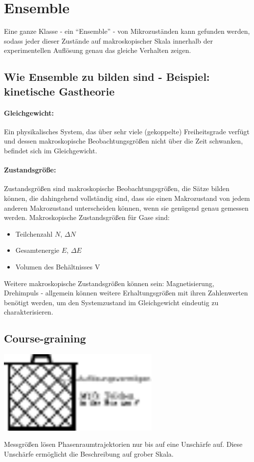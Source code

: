     \section{Ensemble}

Eine ganze Klasse - ein ``Ensemble'' - von Mikrozuständen
kann gefunden werden, sodass jeder dieser Zustände auf makroskopischer Skala
innerhalb der experimentellen Auflösung genau das gleiche Verhalten zeigen.

    \subsection{Wie Ensemble zu bilden sind - Beispiel: kinetische Gastheorie}

\paragraph{Gleichgewicht:} Ein physikalisches System, das über sehr viele
(gekoppelte) Freiheitsgrade verfügt und dessen makroskopische Beobachtungsgrößen
nicht über die Zeit schwanken, befindet sich im Gleichgewicht.

\paragraph{Zustandsgröße:} Zustandsgrößen sind makroskopische Beobachtungsgrößen, die
Sätze bilden können, die dahingehend vollständig sind, dass sie einen Makrozustand
von jedem anderen Makrozustand unterscheiden können, wenn sie genügend genau gemessen
werden. Makroskopische Zustandsgrößen für Gase sind:
\begin{itemize}
    \item Teilchenzahl $N$, $\Delta N$
    \item Gesamtenergie $E$, $\Delta E$
    \item Volumen des Behältnisses V
\end{itemize}
Weitere makroskopische Zustandsgrößen können sein: Magnetisierung, Drehimpuls -
allgemein können weitere Erhaltungsgrößen mit ihren Zahlenwerten benötigt werden, um
den Systemzustand im Gleichgewicht eindeutig zu charakterisieren.

    \subsection{Course-graining}

\begin{center}
    \includegraphics[width=0.6\textwidth]{Abb/1_3.pdf}
\end{center}

Messgrößen lösen Phasenraumtrajektorien nur bis auf eine Unschärfe auf. Diese
Unschärfe ermöglicht die Beschreibung auf grober Skala.
